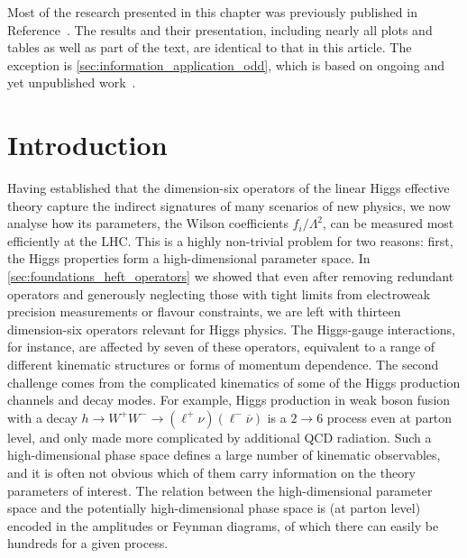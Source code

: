 Most of the research presented in this chapter was previously
published in Reference~\cite{Brehmer:2016nyr}. The results and their
presentation, including nearly all plots and tables as well as part of
the text, are identical to that in this article. The exception is
\autoref{sec:information_application_odd}, which is based on ongoing
and yet unpublished work~\cite{Brehmer:CPV_information}.



\section{Introduction}
\label{sec:information_intro}

Having established that the dimension-six operators of the linear
Higgs effective theory capture the indirect signatures of many
scenarios of new physics, we now analyse how its parameters, the
Wilson coefficients $f_i/\Lambda^2$, can be measured most efficiently
at the LHC. This is a highly non-trivial problem for two reasons:
first, the Higgs properties form a high-dimensional parameter
  space. In \autoref{sec:foundations_heft_operators} we showed that
even after removing redundant operators and generously neglecting
those with tight limits from electroweak precision measurements or
flavour constraints, we are left with thirteen dimension-six operators
relevant for Higgs physics. The Higgs-gauge interactions, for
instance, are affected by seven of these operators, equivalent to a
range of different kinematic structures or forms of momentum
dependence. The second challenge comes from the complicated
  kinematics of some of the Higgs production channels and decay
modes. For example, Higgs production in weak boson fusion with a decay
$h \to W^+W^- \to (\ell^+ \nu) (\ell^- \overbar{\nu})$ is a $2 \to 6$
process even at parton level, and only made more complicated by
additional QCD radiation. Such a high-dimensional phase space defines
a large number of kinematic observables, and it is often not obvious
which of them carry information on the theory parameters of
interest. The relation between the high-dimensional parameter space
and the potentially high-dimensional phase space is (at parton level)
encoded in the amplitudes or Feynman diagrams, of which there can
easily be hundreds for a given process.

